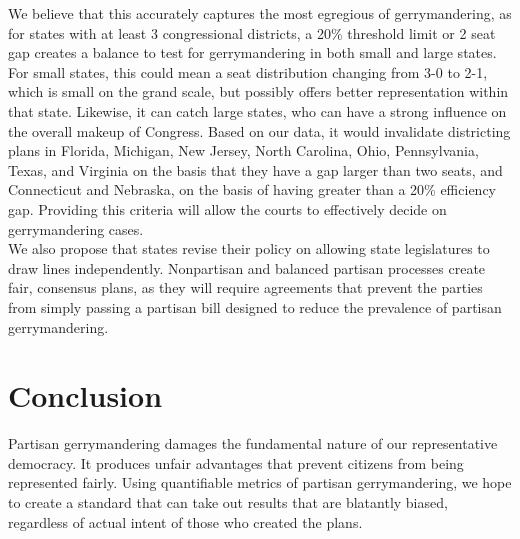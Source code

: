\documentclass[12pt]{article}
\begin{document}
  We believe that this accurately captures the most egregious of gerrymandering, as for states with at least 3 congressional districts, a 20\% threshold limit or 2 seat gap creates a balance to test for gerrymandering in both small and large states.  For small states, this could mean a seat distribution changing from 3-0 to 2-1, which is small on the grand scale, but possibly offers better representation within that state. Likewise, it can catch large states, who can have a strong influence on the overall makeup of Congress.  Based on our data, it would invalidate districting plans in Florida, Michigan, New Jersey, North Carolina, Ohio, Pennsylvania, Texas, and Virginia on the basis that they have a gap larger than two seats, and Connecticut and Nebraska, on the basis of having greater than a 20\% efficiency gap. Providing this criteria will allow the courts to effectively decide on gerrymandering cases.\\

  We also propose that states revise their policy on allowing state legislatures to draw lines independently.  Nonpartisan and balanced partisan processes create fair, consensus plans, as they will require agreements that prevent the parties from simply passing a partisan bill designed to reduce the prevalence of partisan gerrymandering.  
  
  \section{Conclusion}
  Partisan gerrymandering damages the fundamental nature of our representative democracy.  It produces unfair advantages that prevent citizens from being represented fairly.  Using quantifiable metrics of partisan gerrymandering, we hope to create a standard that can take out results that are blatantly biased, regardless of actual intent of those who created the plans.
  
  \singlespacing{}

  \printbibliography{}
\end{document}
